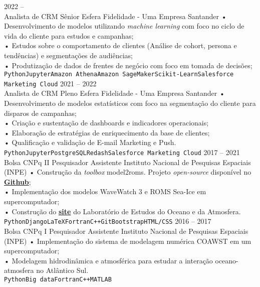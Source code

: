 \documentclass[9pt]{developercv} %
\begin{document}
\begin{entrylist}
	\entry
		{2022 --  \\}
		{Analista de CRM Sênior}
		{Esfera Fidelidade - Uma Empresa Santander}
		{• Desenvolvimento de modelos utilizando \textit{machine learning} com foco no ciclo de vida do cliente para estudos e campanhas;\\
		• Estudos sobre o comportamento de clientes (Análise de cohort, persona e tendências) e segmentações de audiências;\\
		• Produtização de dados de frentes de negócio com foco em tomada de decisões;\\
		\texttt{Python}\slashsep\texttt{Jupyter}\slashsep\texttt{Amazon Athena}\slashsep\texttt{Amazon SageMaker}\slashsep\texttt{Scikit-Learn}\slashsep\texttt{Salesforce Marketing Cloud}}
		\entry
		{2021 --  2022\\}
		{Analista de CRM Pleno}
		{Esfera Fidelidade - Uma Empresa Santander}
		{• Desenvolvimento de modelos estatísticos com foco na segmentação do cliente para disparos de campanhas;\\
		• Criação e sustentação de dashboards e indicadores operacionais;\\
		• Elaboração de estratégias de enriquecimento da base de clientes;\\
		• Qualificação e validação de E-mail Marketing e Push.\\
		\texttt{Python}\slashsep\texttt{Jupyter}\slashsep\texttt{PostgreSQL}\slashsep\texttt{Redash}\slashsep\texttt{Salesforce Marketing Cloud}}
		\entry
		{2017 -- 2021\\\footnotesize{Bolsa CNPq II}}
		{Pesquisador Assistente}
		{Instituto Nacional de Pesquisas Espaciais (INPE)}
		{• Construção da \textit{toolbox} model2roms. Projeto \textit{open-source} disponível no \href{https://github.com/uesleisutil/model2roms}{\textcolor{bleu_cite}{\textbf{Github}}}; \\	
		• Implementação dos modelos WaveWatch 3 e ROMS Sea-Ice em supercomputador;\\
		• Construção do \href{https://loa-inpe.github.io/}{\textcolor{bleu_cite}{\textbf{site}}} do Laboratório de Estudos do Oceano e da Atmosfera. \\
		\texttt{Python}\slashsep\texttt{Django}\slashsep\texttt{LaTeX}\slashsep\texttt{Fortran}\slashsep\texttt{C++}\slashsep\texttt{Git}\slashsep\texttt{Bootstrap}\slashsep\texttt{HTML/CSS}}
	\entry
		{2016 -- 2017\\\footnotesize{Bolsa CNPq I}}
		{Pesquisador Assistente}
		{Instituto Nacional de Pesquisas Espaciais (INPE)}
		{•  Implementação do sistema de modelagem numérica COAWST em um supercomputador; \\
		 • Modelagem hidrodinâmica e atmosférica para estudar a interação oceano-atmosfera no Atlântico Sul. 
		 \\ \texttt{Python}\slashsep\texttt{Big data}\slashsep\texttt{Fortran}\slashsep\texttt{C++}\slashsep\texttt{MATLAB}}
\end{entrylist}
\end{document}

